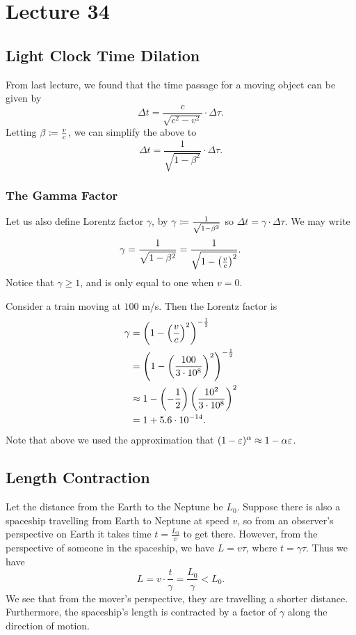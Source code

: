 \documentclass[class=article, crop=false]{standalone}
\begin{document}
  \section{Lecture 34}
  \subsection{Light Clock Time Dilation}
  From last lecture, we found that the time passage for a moving object can be given by
  \[
    \Delta t = \frac{c}{\sqrt{c^2 - v^2}}\cdot \Delta\tau.
  \]
  Letting $\beta\coloneqq \frac{v}{c}$, we can simplify the above to
  \[
    \Delta t = \frac{1}{\sqrt{1 - \beta^2}}\cdot \Delta\tau.
  \]
  \subsubsection{The Gamma Factor}
  Let us also define Lorentz factor $\gamma$, by $\gamma \coloneqq \frac{1}{\sqrt{1 - \beta^2}}$ so $\Delta t = \gamma\cdot \Delta \tau$. We may write
  \[
    \gamma = \frac{1}{\sqrt{1 - \beta^2}} = \frac{1}{\sqrt{1 - \left( \frac{v}{c} \right)^2}}.
  \]
  Notice that $\gamma\geq 1$, and is only equal to one when $v = 0$.
  \begin{example}{}
    Consider a train moving at $100$ m/s. Then the Lorentz factor is
    \begin{align*}
      \gamma &= \left( 1 - \left( \frac{v}{c} \right)^2 \right)^{-\frac{1}{2}} \\
             &= \left( 1 - \left( \frac{100}{3\cdot 10^8} \right)^2 \right)^{-\frac{1}{2}} \\
             &\approx 1 - \left( -\frac{1}{2} \right)\left( \frac{10^2}{3\cdot 10^8} \right)^2 \\
             &= 1 + 5.6\cdot 10^{-14}.
    \end{align*}
    Note that above we used the approximation that $(1 - \varepsilon)^\alpha\approx 1 - \alpha\varepsilon$.
  \end{example}
  \subsection{Length Contraction}
  Let the distance from the Earth to the Neptune be $L_0$. Suppose there is also a spaceship travelling from Earth to Neptune at speed $v$, so from an observer's perspective on Earth it takes time $t = \frac{L_0}{v}$ to get there. However, from the perspective of someone in the spaceship, we have $L = v\tau$, where $t = \gamma\tau$. Thus we have
  \[
    L = v\cdot \frac{t}{\gamma} = \frac{L_0}{\gamma} < L_0.
  \]
  We see that from the mover's perspective, they are travelling a shorter distance. Furthermore, the spaceship's length is contracted by a factor of $\gamma$ along the direction of motion.
\end{document}
